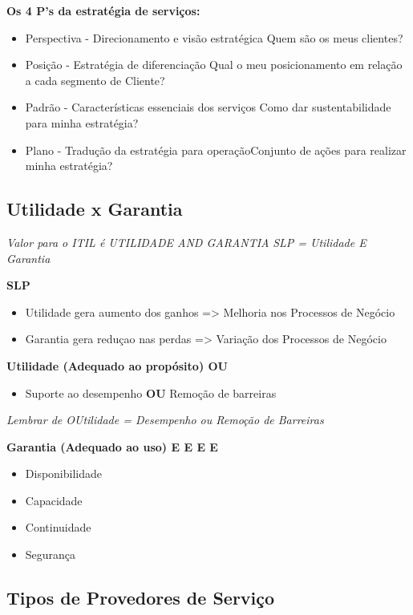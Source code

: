 \textbf{Os 4 P’s da estratégia de serviços:}
\begin{itemize}
	\item Perspectiva - Direcionamento e visão estratégica Quem são os meus clientes?
	\item Posição - Estratégia de diferenciação Qual o meu posicionamento em relação a cada segmento de Cliente?
	\item Padrão - Características essenciais dos serviços Como dar sustentabilidade para minha estratégia?
	\item Plano - Tradução da estratégia para operaçãoConjunto de ações para realizar minha estratégia?
\end{itemize}


\subsection{Utilidade x Garantia}

\begin{center}
	\emph{Valor para o ITIL é UTILIDADE AND GARANTIA}
	\emph{SLP = Utilidade E Garantia}
\end{center}

\textbf{SLP}
\begin{itemize}
	\item Utilidade gera aumento dos ganhos => Melhoria nos Processos de Negócio
	\item Garantia gera reduçao nas perdas => Variação dos Processos de Negócio
\end{itemize}

\textbf{Utilidade (Adequado ao propósito) OU}
\begin{itemize}
	\item Suporte ao desempenho \textbf{OU} Remoção de barreiras
\end{itemize}

\begin{center}
	\emph{Lembrar de OUtilidade = Desempenho ou Remoção de Barreiras}
\end{center}

\textbf{Garantia (Adequado ao uso) E E E E}
\begin{itemize}
	\item Disponibilidade
	\item Capacidade
	\item Continuidade
	\item Segurança
\end{itemize}

\subsection{Tipos de Provedores de Serviço}

